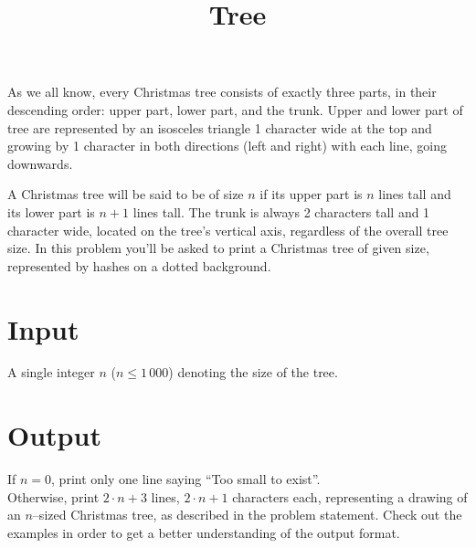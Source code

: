 \documentclass[zad,zawodnik,utf8,en]{sinol}
\title{Tree}
\begin{document}
\begin{tasktext}

  As we all know, every Christmas tree consists of exactly three parts,
  in their descending order: upper part, lower part, and the trunk.
  Upper and lower part of tree are represented by an isosceles triangle 1 character wide
  at the top and growing by 1 character in both directions (left and right) 
  with each line, going downwards.
  
  A Christmas tree will be said to be of size $n$ if its upper part
  is $n$ lines tall and its lower part is $n + 1$ lines tall. 
  The trunk is always 2 characters tall and 1 character wide, located on
  the tree's vertical axis, regardless of the overall tree size.
  In this problem you'll be asked to print a Christmas tree of given size,
  represented by hashes on a dotted background.

  \section{Input}

    A single integer $n$ ($n \leq 1\,000$) denoting the size of the tree.

  \section{Output}

    If $n=0$, print only one line saying ``Too small to exist''.\\
    Otherwise, print $2 \cdot n + 3$ lines, $2 \cdot n + 1$ characters each, representing a drawing 
    of an $n$–sized Christmas tree, as described in the problem statement.
    Check out the examples in order to get a better understanding of the output format.

\examplesection

\end{tasktext}
\end{document}
